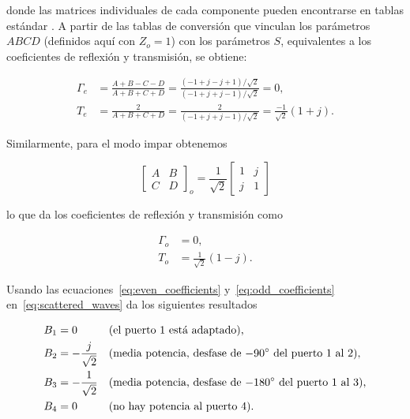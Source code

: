 donde las matrices individuales de cada componente pueden encontrarse en tablas estándar \cite{pozar2011}. A partir de las tablas de conversión que vinculan los parámetros $ABCD$ (definidos aquí con $Z_o = 1$) con los parámetros $S$, equivalentes a los coeficientes de reflexión y transmisión, se obtiene:

\begin{subequations}
    \begin{align}
        \Gamma_e &= \frac{A+B-C-D}{A+B+C+D} = \frac{(-1+j-j+1)/\sqrt{2}}{(-1+j+j-1)/\sqrt{2}} = 0, \\
        T_e &= \frac{2}{A+B+C+D} = \frac{2}{(-1+j+j-1)/\sqrt{2}} = \frac{-1}{\sqrt{2}}(1+j).
    \end{align}
    \label{eq:even_coefficients}
\end{subequations}

Similarmente, para el modo impar obtenemos

\begin{equation}
    \begin{bmatrix} 
        A & B \\ 
        C & D 
    \end{bmatrix}_{\!o} 
    = \frac{1}{\sqrt{2}} 
    \begin{bmatrix} 
        1 & j \\ 
        j & 1 
    \end{bmatrix}
    \label{eq:abcd_odd}
\end{equation}

lo que da los coeficientes de reflexión y transmisión como

\begin{subequations}
    \begin{align}
        \Gamma_o &= 0, \\
        T_o &= \frac{1}{\sqrt{2}}(1-j).
    \end{align}
    \label{eq:odd_coefficients}
\end{subequations}

Usando las ecuaciones~\eqref{eq:even_coefficients} y~\eqref{eq:odd_coefficients} en~\eqref{eq:scattered_waves} da los siguientes resultados

\begin{subequations}
    \begin{align}
        B_1 &= 0                   && \text{\normalsize(el puerto 1 está adaptado),} \\
        B_2 &= -\frac{j}{\sqrt{2}} && \text{\normalsize(media potencia, desfase de $-90^{\circ}$ del puerto 1 al 2),} \\
        B_3 &= -\frac{1}{\sqrt{2}} && \text{\normalsize(media potencia, desfase de $-180^{\circ}$ del puerto 1 al 3),} \\
        B_4 &= 0                   && \text{\normalsize(no hay potencia al puerto 4).}
    \end{align}
    \label{eq:final_results}
\end{subequations}

